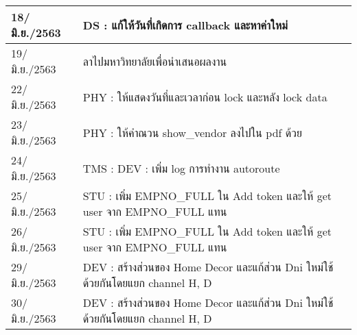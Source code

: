 \begin{longtable}{|l|l|}
	\hline
	18/มิ.ย./2563   & DS : แก้ให้วันที่เกิดการ callback และหาค่าใหม่                                  \\ 
	\hline
	19/มิ.ย./2563   & ลาไปมหาวิทยาลัยเพื่อนำเสนอผลงาน                                                 \\ 
	\hline
	22/มิ.ย./2563   & PHY : ให้แสดงวันที่และเวลาก่อน lock และหลัง lock data                           \\ 
	\hline
	23/มิ.ย./2563   & PHY : ให้คำณวน show\_vendor ลงไปใน pdf ด้วย                                     \\ 
	\hline
	24/มิ.ย./2563   & TMS : DEV : เพิ่ม log การทำงาน autoroute                                        \\ 
	\hline
	25/มิ.ย./2563   & STU : เพิ่ม EMPNO\_FULL ใน Add token และให้ get user จาก EMPNO\_FULL แทน        \\ 
	\hline
	26/มิ.ย./2563   & STU : เพิ่ม EMPNO\_FULL ใน Add token และให้ get user จาก EMPNO\_FULL แทน        \\ 
	\hline
	29/มิ.ย./2563   & DEV : สร้างส่วนของ Home Decor และแก้ส่วน Dni ใหม่ใช้ด้วยกันโดยแยก channel H, D  \\ 
	\hline
	30/มิ.ย./2563   & DEV : สร้างส่วนของ Home Decor และแก้ส่วน Dni ใหม่ใช้ด้วยกันโดยแยก channel H, D  \\
	\hline
\end{longtable}

